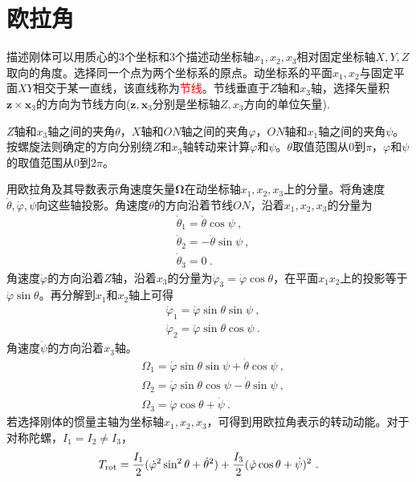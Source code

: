 \documentclass[11pt,a4paper]{article}
\renewcommand{\vec}[1]{\boldsymbol{#1}}
\begin{document}
\section{欧拉角}
描述刚体可以用质心的$3$个坐标和$3$个描述动坐标轴$x_1, x_2, x_3$相对固定坐标轴$X, Y, Z$取向的角度。选择同一个点为两个坐标系的原点。动坐标系的平面$x_1, x_2$与固定平面$XY$相交于某一直线，该直线称为\textcolor{red}{节线}。节线垂直于$Z$轴和$x_3$轴，选择矢量积$\vec{z} \times \vec{x}_3$的方向为节线方向($\vec{z}, \vec{x}_3$分别是坐标轴$Z, x_3$方向的单位矢量).

$Z$轴和$x_3$轴之间的夹角$\theta$，$X$轴和$ON$轴之间的夹角$\varphi$，$ON$轴和$x_1$轴之间的夹角$\psi$。按螺旋法则确定的方向分别绕$Z$和$x_3$轴转动来计算$\varphi$和$\psi$。$\theta$取值范围从$0$到$\pi$，$\varphi$和$\psi$的取值范围从$0$到$2\pi$。

用欧拉角及其导数表示角速度矢量$\vec{\Omega}$在动坐标轴$x_1, x_2, x_3$上的分量。将角速度$\dot{\theta}, \dot{\varphi}, \dot{\psi}$向这些轴投影。角速度$\dot{\theta}$的方向沿着节线$ON$，沿着$x_1, x_2, x_3$的分量为
\begin{align}
& \dot{\theta}_1 = \dot{\theta} \cos \psi ~, \\
& \dot{\theta}_2 = -\dot{\theta} \sin \psi ~, \\
& \dot{\theta}_3 = 0 ~.
\end{align}
角速度$\dot{\varphi}$的方向沿着$Z$轴，沿着$x_3$的分量为$\dot{\varphi}_3 = \dot{\varphi} \cos \theta$，在平面$x_1 x_2$上的投影等于$\dot{\varphi}\sin \theta$。再分解到$x_1$和$x_2$轴上可得
\begin{align}
& \dot{\varphi}_1 = \dot{\varphi} \sin \theta \sin \psi ~, \\
& \dot{\varphi}_2 = \dot{\varphi} \sin \theta \cos \psi ~.
\end{align}
角速度$\dot{\psi}$的方向沿着$x_3$轴。
\begin{align}
& \Omega_1 = \dot{\varphi} \sin \theta \sin \psi +\dot{\theta} \cos \psi ~, \\
& \Omega_2 = \dot{\varphi} \sin \theta \cos \psi -\dot{\theta} \sin \psi ~, \\
& \Omega_3 = \dot{\varphi} \cos \theta +\dot{\psi} ~.
\end{align}
若选择刚体的惯量主轴为坐标轴$x_1, x_2, x_3$，可得到用欧拉角表示的转动动能。对于对称陀螺，$I_1 = I_2 \neq I_3$，
\begin{equation}
T_{\rm rot} = \dfrac{I_1}{2}(\dot{\varphi}^2 \sin^2 \theta +\dot{\theta}^2) +\dfrac{I_3}{2} (\dot{\varphi} \cos \theta +\dot{\psi})^2 ~.
\end{equation}
\end{document}
